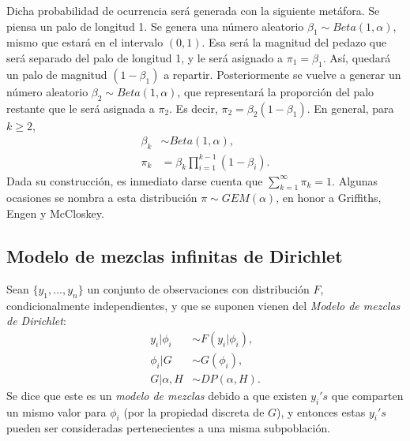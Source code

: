 Dicha probabilidad de ocurrencia ser\'a generada con la siguiente met\'afora. Se piensa un palo de longitud 1. Se genera una n\'umero aleatorio $\beta_1 \sim Beta(1,\alpha)$, mismo que estar\'a en el intervalo $(0,1)$. Esa ser\'a la magnitud del pedazo que ser\'a separado del palo de longitud 1, y le ser\'a asignado a $\pi_1 = \beta_1$. As\'i, quedar\'a un palo de magnitud $(1-\beta_1)$ a repartir. Posteriormente se vuelve a generar un n\'umero aleatorio $\beta_2 \sim Beta(1,\alpha)$, que representar\'a la proporci\'on del palo restante que le ser\'a asignada a $\pi_2$. Es decir, $\pi_2 = \beta_2(1-\beta_1)$. En general, para $k \geq 2$,
\begin{equation*}
\begin{aligned}
   \beta_k &\sim Beta(1,\alpha),\\
   \pi_k &= \beta_k \prod_{i=1}^{k-1}(1 - \beta_i).
\end{aligned}
\end{equation*}
Dada su construcci\'on, es inmediato darse cuenta que $\sum_{k=1}^\infty \pi_k = 1$. Algunas ocasiones se nombra a esta distribuci\'on $\pi \sim GEM(\alpha)$, en honor a Griffiths, Engen y McCloskey.

\subsection{Modelo de mezclas infinitas de Dirichlet}

Sean $\{y_1,...,y_n\}$ un conjunto de observaciones con distribuci\'on $F$, condicionalmente independientes, y que se suponen vienen del \textit{Modelo de mezclas de Dirichlet}:
\begin{equation*}
\begin{aligned}
   y_i | \phi_i &\sim F(y_i | \phi_i), \\
   \phi_i | G &\sim G(\phi_i), \\
   G | \alpha, H &\sim DP(\alpha,H).
\end{aligned}
\end{equation*}
Se dice que este es un \textit{modelo de mezclas} debido a que existen $y_i's$ que comparten un mismo valor para $\phi_i$ (por la propiedad discreta de $G$), y entonces estas $y_i's$ pueden ser consideradas pertenecientes a una misma subpoblaci\'on.

